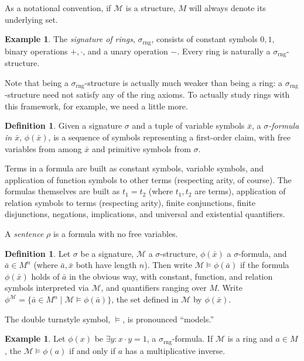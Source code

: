 \documentclass{article}
\theoremstyle{plain}
\theoremstyle{definition}
\newtheorem{defn}[thm]{Definition}
\newtheorem{example}[thm]{Example}
\newcommand{\defterm}{\emph}
\newcommand{\ringsig}{\sigma_{\operatorname{rng}}}
\newcommand{\tuple}{\bar}
\begin{document}
As a notational convention, if $\mathcal{M}$ is a structure, $M$ will
always denote its underlying set.

\begin{example}
  The \defterm{signature of rings}, $\ringsig$, consists of constant
  symbols $0, 1$, binary operations $+, \cdot$, and a unary operation
  $-$. Every ring is naturally a $\ringsig$-structure.
\end{example}

Note that being a $\ringsig$-structure is actually much weaker than
being a ring: a $\ringsig$-structure need not satisfy any of the ring
axioms. To actually study rings with this framework, for example, we
need a little more.

\begin{defn}
  Given a signature $\sigma$ and a tuple of variable symbols
  $\tuple{x}$, a \defterm{$\sigma$-formula in $\tuple{x}$},
  $\phi(\tuple{x})$, is a sequence of symbols representing a
  first-order claim, with free variables from among $\tuple{x}$ and
  primitive symbols from $\sigma$.

  Terms in a formula are built as constant symbols, variable symbols,
  and application of function symbols to other terms (respecting
  arity, of course). The formulas themselves are built as $t_1 = t_2$
  (where $t_1, t_2$ are terms), application of relation symbols to
  terms (respecting arity), finite conjunctions, finite disjunctions,
  negations, implications, and universal and existential quantifiers.

  A \defterm{sentence} $\rho$ is a formula with no free variables.
\end{defn}

\begin{defn}
  Let $\sigma$ be a signature, $\mathcal{M}$ a $\sigma$-structure,
  $\phi(\tuple{x})$ a $\sigma$-formula, and $\tuple{a} \in M^n$ (where
  $\tuple{a}, \tuple{x}$ both have length $n$). Then write
  $\mathcal{M} \models \phi(\tuple{a})$ if the formula
  $\phi(\tuple{x})$ holds of $\tuple{a}$ in the obvious way, with
  constant, function, and relation symbols interpreted via
  $\mathcal{M}$, and quantifiers ranging over $M$. Write
  $\phi^\mathcal{M} = \{ \tuple{a} \in M^n \mid \mathcal{M} \models
  \phi(\tuple{a})\}$, the set defined in $\mathcal{M}$ by
  $\phi(\tuple{x})$.

  The double turnstyle symbol, $\models$, is pronounced ``models.''
\end{defn}

\begin{example}
  Let $\phi(x)$ be $\exists y: x \cdot y = 1$, a
  $\ringsig$-formula. If $\mathcal{M}$ is a ring and $a \in M$, the
  $\mathcal{M} \models \phi(a)$ if and only if $a$ has a
  multiplicative inverse.
\end{example}
\end{document}
